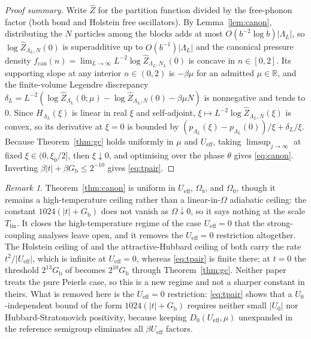 \documentclass[11pt]{article}
\theoremstyle{definition}
\theoremstyle{remark}
\newtheorem{remark}[theorem]{Remark}
\newcommand{\R}{\mathbb{R}}
\newcommand{\eff}{\mathrm{eff}}
\newcommand{\Tlin}{T_{\mathrm{lin}}}
\newcommand{\Gb}{G_{\mathrm{b}}}
\newcommand{\Ueff}{U_{\eff}}
\begin{document}
\begin{proof}[Proof summary]
Write $\widehat Z$ for the partition function divided by the free-phonon factor (both
bond and Holstein free oscillators). By Lemma~\ref{lem:canon}, distributing the $N$
particles among the blocks adds at most $O(b^{-2}\log b)|\Lambda_L|$, so
$\log\widehat Z_{\Lambda_L,N}(0)$ is superadditive up to $O(b^{-1})|\Lambda_L|$ and
the canonical pressure density $f_{\mathrm{can}}(n)=\lim_{L\to\infty}L^{-2}\log
\widehat Z_{\Lambda_L,N_L}(0)$ is concave in $n\in[0,2]$. Its supporting slope at
any interior $n\in(0,2)$ is $-\beta\mu$ for an admitted $\mu\in\R$, and the
finite-volume Legendre discrepancy $\delta_L=L^{-2}(\log\widehat Z_{\Lambda_L}(0;\mu)
-\log\widehat Z_{\Lambda_L,N}(0)-\beta\mu N)$ is nonnegative and tends to $0$.
Since $H_{\Lambda_L}(\xi)$ is linear in real $\xi$ and self-adjoint,
$\xi\mapsto L^{-2}\log\widehat Z_{\Lambda_L,N}(\xi)$ is convex, so its derivative at
$\xi=0$ is bounded by $(p_{\Lambda_L}(\xi)-p_{\Lambda_L}(0))/\xi+\delta_L/\xi$.
Because Theorem~\ref{thm:gc} holds uniformly in $\mu$ and $\Ueff$, taking
$\limsup_{j\to\infty}$ at fixed $\xi\in(0,\xi_0/2]$, then $\xi\downarrow0$, and
optimising over the phase $\theta$ gives \eqref{eq:canon}. Inverting
$\beta|t|+\beta\Gb\le2^{-10}$ gives \eqref{eq:tpair}.
\end{proof}

\begin{remark}
Theorem~\ref{thm:canon} is uniform in $\Ueff$, $\Omega_b$, and $\Omega_0$, though it
remains a high-temperature ceiling rather than a linear-in-$\Omega$ adiabatic
ceiling: the constant $1024(|t|+\Gb)$ does not vanish as $\Omega\downarrow0$, so it
says nothing at the scale $\Tlin$. It closes the high-temperature regime of the
case $\Ueff=0$ that the strong-coupling analyses leave open, and it removes the
$\Ueff=0$ restriction altogether. The Holstein ceiling of \cite{stage6} and the
attractive-Hubbard ceiling of \cite{sshbond3} both carry the rate $t^2/|\Ueff|$, which
is infinite at $\Ueff=0$, whereas \eqref{eq:tpair} is finite there; at $t=0$ the
threshold $2^{13}\Gb$ of \cite{sshbond3} becomes $2^{10}\Gb$ through
Theorem~\ref{thm:gc}. Neither paper treats the pure Peierls case, so this is a new
regime and not a sharper constant in theirs. What is removed here is the $\Ueff=0$
restriction: \eqref{eq:tpair} shows that a $U_0$-independent bound of the form
$1024(|t|+\Gb)$ requires neither small $|U_0|$ nor Hubbard-Stratonovich positivity,
because keeping $D_0(\Ueff,\mu)$ unexpanded in the reference semigroup eliminates all
$\beta\Ueff$ factors.
\end{remark}
\end{document}
